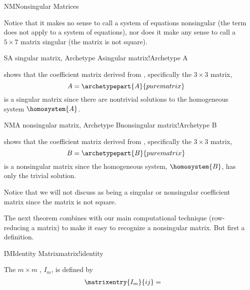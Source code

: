 \begin{subsect}{NM}{Nonsingular Matrices}
%
\begin{para}Notice that it makes no sense to call a system of equations nonsingular (the term does not apply to a system of equations), nor does it make any sense to call a $5\times 7$ matrix singular (the matrix is not square).\end{para}
%
\begin{example}{S}{A singular matrix, Archetype A}{singular matrix!Archetype A}
\begin{para} shows that the coefficient matrix derived from , specifically the $3\times 3$ matrix,
%
\begin{equation*}
A=\archetypepart{A}{purematrix}\end{equation*}
%
is a singular matrix since there are nontrivial solutions to the homogeneous system $\homosystem{A}$.
\end{para}
\end{example}
%
\begin{example}{NM}{A nonsingular matrix, Archetype B}{nonsingular matrix!Archetype B}
\begin{para} shows that the coefficient matrix derived from , specifically the $3\times 3$ matrix,
%
\begin{equation*}
B=\archetypepart{B}{purematrix}\end{equation*}
%
is a nonsingular matrix since the homogeneous system, $\homosystem{B}$, has only the trivial solution.
\end{para}
\end{example}
%
\begin{para}Notice that we will not discuss  as being a  singular or nonsingular coefficient matrix since the matrix is not square.\end{para}
%
%
\begin{para}The next theorem combines with our main computational technique (row-reducing a matrix) to make it easy to recognize a nonsingular matrix.  But first a definition.\end{para}
%
\begin{definition}{IM}{Identity Matrix}{matrix!identity}
\begin{para}The $m\times m$ , $I_m$, is defined by
%
\begin{align*}
\matrixentry{I_m}{ij}&=

\end{align*}
\end{para}
\end{definition}
\end{subsect}

